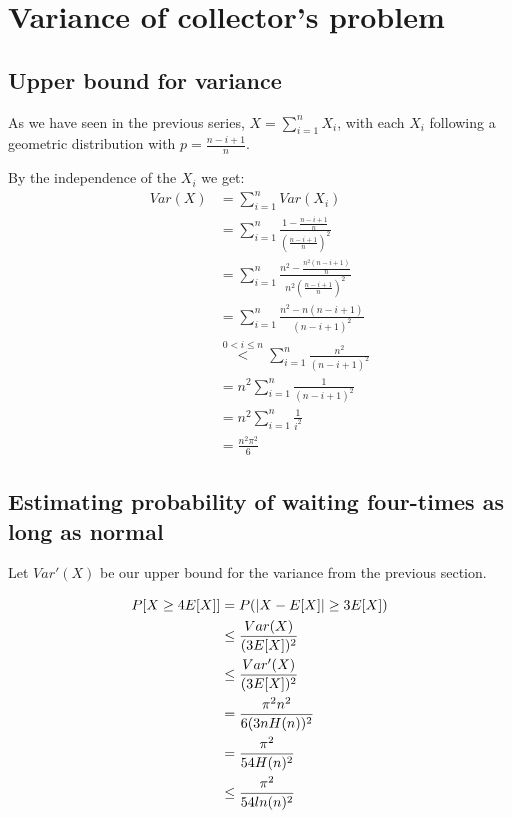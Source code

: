\documentclass[a4paper]{scrreprt}
\DeclarePairedDelimiter\abs{\lvert}{\rvert}
\begin{document}
\section{Variance of collector's problem}

\subsection{Upper bound for variance}

As we have seen in the previous series, $X = \sum_{i=1}^n{X_i}$, with each
$X_i$ following a geometric distribution with $p = \frac{n-i+1}{n}$.

By the independence of the $X_i$ we get:
\begin{align*}
	Var(X) & = \sum_{i=1}^n{Var(X_i)} \\
	& = \sum_{i=1}^n{\frac{1 - \frac{n-i+1}{n}}{\left(\frac{n-i+1}{n}\right)^2}} \\
	& = \sum_{i=1}^n{\frac{n^2 - \frac{n^2 (n-i+1)}{n}}{n^2 \left(\frac{n-i+1}{n}\right)^2}} \\
	& = \sum_{i=1}^n{\frac{n^2 - n (n-i+1)}{(n-i+1)^2}} \\
	& \overset{0 < i \leq n}{<} \sum_{i=1}^n{\frac{n^2}{(n-i+1)^2}} \\
	& = n^2 \sum_{i=1}^n{\frac{1}{(n-i+1)^2}} \\
	& = n^2 \sum_{i=1}^n{\frac{1}{i^2}} \\
	& = \frac{n^2 \pi^2}{6}
\end{align*}

\subsection{Estimating probability of waiting four-times as long as normal}

Let $Var'(X)$ be our upper bound for the variance from the previous section.

\begin{align*}
	P[X \geq 4 E[X]] & = P(\abs{X - E[X]} \geq 3 E[X]) \\
	& \leq \frac{Var(X)}{(3 E[X])^2} \\
	& \leq \frac{Var'(X)}{(3 E[X])^2} \\
	& = \frac{\pi^2 n^2}{6 (3 n H(n))^2} \\
	& = \frac{\pi^2}{54 H(n)^2} \\
	& \leq \frac{\pi^2}{54 ln(n)^2}
\end{align*}
\end{document}
